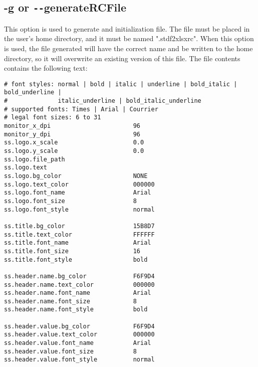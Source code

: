 \documentclass[letterpaper]{article}
\begin{document}
\subsection{\bf -g or \texttt{-{}-}generateRCFile}
This option is used to generate and initialization file.  The file
must be placed in the user's home directory, and it must be
named ".stdf2xlsxrc".  When this option is used, the file generated
will have the correct name and be written to the home directory, so
it will overwrite an existing version of this file. The file contents
contains the following text:
\begin{verbatim}
# font styles: normal | bold | italic | underline | bold_italic | bold_underline | 
#              italic_underline | bold_italic_underline
# supported fonts: Times | Arial | Courrier
# legal font sizes: 6 to 31
monitor_x_dpi                       96
monitor_y_dpi                       96
ss.logo.x_scale                     0.0
ss.logo.y_scale                     0.0
ss.logo.file_path           
ss.logo.text
ss.logo.bg_color                    NONE
ss.logo.text_color                  000000
ss.logo.font_name                   Arial
ss.logo.font_size                   8
ss.logo.font_style                  normal

ss.title.bg_color                   15B8D7
ss.title.text_color                 FFFFFF
ss.title.font_name                  Arial
ss.title.font_size                  16
ss.title.font_style                 bold

ss.header.name.bg_color             F6F9D4
ss.header.name.text_color           000000
ss.header.name.font_name            Arial
ss.header.name.font_size            8   
ss.header.name.font_style           bold

ss.header.value.bg_color            F6F9D4
ss.header.value.text_color          000000
ss.header.value.font_name           Arial
ss.header.value.font_size           8   
ss.header.value.font_style          normal
\end{verbatim}
\clearpage
\end{document}

